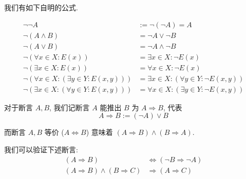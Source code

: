 我们有如下自明的公式.

\begin{theorem}
    \begin{align}
        \neg \neg A &:= \neg (\neg A) = A \\
        \neg (A \land B) &= \neg A \lor \neg B \\
        \neg (A \lor B) &= \neg A \land \neg B \\
        \neg (\forall x \in X : E(x)) &= \exists x \in X : \neg E(x) \\
        \neg (\exists x \in X : E(x)) &= \forall x \in X : \neg E(x) \\
        \neg (\forall x \in X : (\exists y \in Y : E(x, y))) &= \exists x \in X : (\forall y \in Y : \neg E(x, y)) \\
        \neg (\exists x \in X : (\forall y \in Y : E(x, y))) &= \forall x \in X : (\exists y \in Y : \neg E(x, y))
    \end{align}
\end{theorem}

\begin{definition}
    对于断言 \(A, B\), 我们记断言 \(A\) 能推出 \(B\) 为 \(A \Rightarrow B\), 代表
    \begin{equation}
        A \Rightarrow B := (\neg A) \lor B
    \end{equation}

    而断言 \(A, B\) 等价 (\(A \Leftrightarrow B\)) 意味着 \((A \Rightarrow B) \land (B \Rightarrow A)\).
\end{definition}

\begin{theorem}
    我们可以验证下述断言:
    \begin{align}
        (A \Rightarrow B) &\Leftrightarrow (\neg B \Rightarrow \neg A) \\
        (A \Rightarrow B) \land (B \Rightarrow C) &\Rightarrow (A \Rightarrow C)
    \end{align}
\end{theorem}
